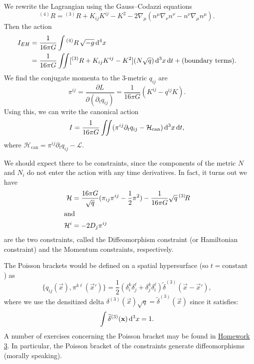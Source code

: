 We rewrite the Lagrangian using the Gauss--Codazzi equations
\begin{equation}
{}^{(4)}R = {}^{(3)}R + K_{ij}K^{ij} - K^{2} - 2\nabla_{\mu}(n^{\mu}\nabla_{\nu}n^{\nu}-n^{\nu}
\nabla_{\mu}n^{\mu}).
\end{equation}
Then the action
\begin{subequations}
\begin{align}
I_{EH} &= \frac{1}{16\pi G}\int {}^{(4)}R\,\sqrt{-g}\,\mathrm{d}^{4}x\\
&= \frac{1}{16\pi G}\iint [{}^{(3)}R + K_{ij}K^{ij} - K^{2}](N\sqrt{q})\,\mathrm{d}^{3}x\,\mathrm{d} t
+ \mbox{(boundary terms)}.
\end{align}
\end{subequations}
We find the conjugate momenta to the 3-metric $q_{ij}$ are
\begin{equation}
\pi^{ij} = \frac{\partial L}{\partial(\partial_{t}q_{ij})}
= \frac{1}{16\pi G}(K^{ij} - q^{ij}K).
\end{equation}
Using this, we can write the canonical action
\begin{equation}
I = \frac{1}{16\pi G}\iint(\pi^{ij}\partial_{t}q_{ij} - \mathcal{H}_{\text{can}})\,\mathrm{d}^{3}x\,\mathrm{d} t,
\end{equation}
where $\mathcal{H}_{\text{can}} = \pi^{ij}\partial_{t}q_{ij} - \mathcal{L}$.

We should expect there to be constraints, since the components of the
metric $N$ and $N_{i}$ do not enter the action with any time derivatives.
In fact, it turns out we have
\begin{subequations}
\begin{align}
\mathcal{H} &= \frac{16\pi G}{\sqrt{q}}(\pi_{ij}\pi^{ij} - \frac{1}{2}\pi^{2})
-\frac{1}{16\pi G}\sqrt{q}\,{}^{(3)}\!R\\
\intertext{and}
\mathcal{H}^{i} &= -2D_{j}\pi^{ij}
\end{align}
\end{subequations}
are the two constraints, called the Diffeomorphism constraint (or
Hamiltonian constraint) and the Momentum constraints, respectively.

The Poisson brackets would be defined on a spatial hypersurface (so
$t=\mbox{constant}$) as
\begin{equation}
\{q_{ij}(\vec{x}), \pi^{k\ell}(\vec{x}')\}
= \frac{1}{2}(\delta^{k}_{i}\delta^{\ell}_{j} + 
\delta^{k}_{j}\delta^{\ell}_{i})\widetilde{\delta}^{(3)}(\vec{x}-\vec{x}'),
\end{equation}
where we use the densitized delta $\delta^{(3)}(\vec{x})\sqrt{q}=\widetilde{\delta}^{(3)}(\vec{x})$
since it satisfies:
\begin{equation}
\int\widetilde{\delta}^{(3)}(\mathbf{x})\,\mathrm{d}^{3}x=1.
\end{equation}
A number of exercises concerning the Poisson bracket may be found
in \hyperref[section:hw3]{Homework 3}. In particular, the Poisson
bracket of the constraints generate diffeomorphisms (morally speaking).